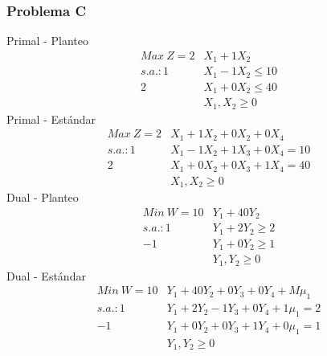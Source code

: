 \begin{homeworkProblem}
\subsubsection{Problema C}
Primal - Planteo
\begin{align*}
Max\ Z = 2&X_1 + 1X_2 \\
s.a.:1&X_1 - 1X_2 \le 10 \\
2&X_1 + 0X_2 \le 40  \\
&X_1,X_2 \ge 0
\end{align*}
Primal - Estándar
\begin{align*}
Max\ Z = 2&X_1 + 1X_2 + 0X_2 + 0X_4 \\
s.a.:1&X_1 - 1X_2 + 1X_3 + 0X_4 = 10 \\
2&X_1 + 0X_2 + 0X_3 + 1X_4 = 40  \\
&X_1,X_2 \ge 0
\end{align*}
Dual - Planteo
\begin{align*}
Min\ W = 10&Y_1 + 40Y_2 \\
s.a.:1&Y_1 + 2Y_2 \ge 2 \\
-1&Y_1 + 0Y_2 \ge 1 \\
&Y_1,Y_2 \ge 0 
\end{align*}
Dual - Estándar
\begin{align*}
Min\ W = 10&Y_1 + 40Y_2 + 0Y_3 +0Y_4 + M\mu_1 \\
s.a.:1&Y_1 + 2Y_2 -1Y_3 + 0Y_4 + 1\mu_1 =  2 \\
-1&Y_1 + 0Y_2 + 0Y_3 + 1Y_4 +0\mu_1 = 1 \\
&Y_1,Y_2 \ge 0 
\end{align*}


\end{homeworkProblem}
